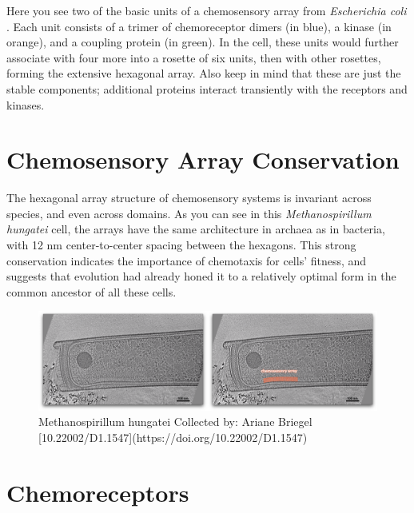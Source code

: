 \documentclass[]{tufte-book}
\begin{document}
Here you see two of the basic units of a chemosensory array from
\emph{Escherichia coli} \citet{cassidy2020}. Each unit consists of a
trimer of chemoreceptor dimers (in blue), a kinase (in orange), and a
coupling protein (in green). In the cell, these units would further
associate with four more into a rosette of six units, then with other
rosettes, forming the extensive hexagonal array. Also keep in mind that
these are just the stable components; additional proteins interact
transiently with the receptors and kinases.

\section{Chemosensory Array
Conservation}\label{chemosensory-array-conservation}

The hexagonal array structure of chemosensory systems is invariant
across species, and even across domains. As you can see in this
\emph{Methanospirillum hungatei} cell, the arrays have the same
architecture in archaea as in bacteria, with 12 nm center-to-center
spacing between the hexagons. This strong conservation indicates the
importance of chemotaxis for cells' fitness, and suggests that evolution
had already honed it to a relatively optimal form in the common ancestor
of all these cells.

\begin{figure}
\includegraphics{movie_stills/7_3} \caption[Methanospirillum hungatei Collected by]{Methanospirillum hungatei Collected by: Ariane Briegel [10.22002/D1.1547](https://doi.org/10.22002/D1.1547)}\label{fig:unnamed-chunk-126}
\end{figure}

\section{Chemoreceptors}\label{chemoreceptors}
\end{document}
